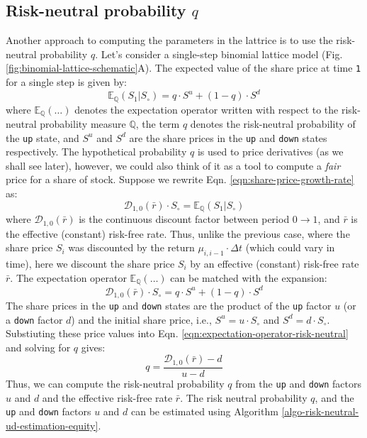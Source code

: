 \documentclass[11pt]{article}
\theoremstyle{definition}
\begin{document}
\subsection*{Risk-neutral probability $q$}
Another approach to computing the parameters in the lattrice is to use the risk-neutral probability $q$. 
Let's consider a single-step binomial lattice model (Fig. \ref{fig:binomial-lattice-schematic}A). 
The  expected value of the share price at time \texttt{1} for a single step is given by:
\begin{equation*}
	\mathbb{E}_{\mathbb{Q}}(S_{1} | S_{\circ}) = q\cdot{S^{u}} + (1-q)\cdot{S^{d}}
\end{equation*}
where $\mathbb{E}_{\mathbb{Q}}(\dots)$ denotes the expectation operator written with respect to the risk-neutral probability measure $\mathbb{Q}$, 
the term $q$ denotes the risk-neutral probability of the \texttt{up} state, and $S^{u}$ and $S^{d}$ are the share prices in the \texttt{up} and \texttt{down} states respectively.
The hypothetical probability $q$ is used to price derivatives (as we shall see later), 
however, we could also think of it as a tool to compute a \textit{fair} price for a share of stock.
Suppose we rewrite Eqn. \eqref{eqn:share-price-growth-rate} as:
\begin{equation}\label{eqn:share-price-growth-rate-2}
    \mathcal{D}_{1,0}(\bar{r})\cdot{S_{\circ}} = \mathbb{E}_{\mathbb{Q}}\left(S_{1}|S_{\circ}\right)
\end{equation}
where $\mathcal{D}_{1,0}(\bar{r})$ is the continuous discount factor between period $0\rightarrow{1}$, 
and $\bar{r}$ is the effective (constant) risk-free rate. Thus, unlike the previous case, where the share price $S_{i}$ was discounted by the
return $\mu_{i,i-1}\cdot\Delta{t}$ (which could vary in time), here we discount the share price $S_{i}$ by an effective (constant) risk-free rate $\bar{r}$.
The expectation operator $\mathbb{E}_{\mathbb{Q}}(\dots)$ can be matched with the expansion:
\begin{equation}\label{eqn:expectation-operator-risk-neutral}
\mathcal{D}_{1,0}(\bar{r})\cdot{S_{\circ}} = q\cdot{S^{u}} + (1-q)\cdot{S^{d}}
\end{equation}
The share prices in the \texttt{up} and \texttt{down} states are the product of the \texttt{up} factor $u$ (or a \texttt{down} factor $d$) and the initial share price, 
i.e., $S^{u} = u\cdot{S_{\circ}}$ and $S^{d} = d\cdot{S_{\circ}}$. Substiuting these price values into Eqn. \eqref{eqn:expectation-operator-risk-neutral} and solving for $q$ gives:
\begin{equation}\label{eqn:risk-neutral-probability}
q = \frac{\mathcal{D}_{1,0}(\bar{r}) - d}{u - d}
\end{equation}
Thus, we can compute the risk-neutral probability $q$ from the \texttt{up} and \texttt{down} factors $u$ and $d$ 
and the effective risk-free rate $\bar{r}$. The risk neutral probability $q$, and the \texttt{up} and \texttt{down} factors $u$ and $d$ 
can be estimated using Algorithm \ref{algo-risk-neutral-ud-estimation-equity}.
\end{document}
